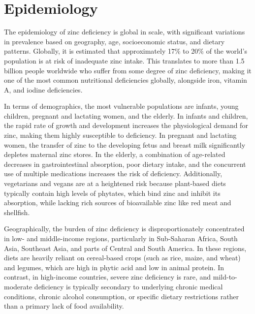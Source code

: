 \section*{Epidemiology}
The epidemiology of zinc deficiency is global in scale, with significant variations in prevalence based on geography, age, socioeconomic status, and dietary patterns. Globally, it is estimated that approximately 17\% to 20\% of the world's population is at risk of inadequate zinc intake. This translates to more than 1.5 billion people worldwide who suffer from some degree of zinc deficiency, making it one of the most common nutritional deficiencies globally, alongside iron, vitamin A, and iodine deficiencies.

In terms of demographics, the most vulnerable populations are infants, young children, pregnant and lactating women, and the elderly. In infants and children, the rapid rate of growth and development increases the physiological demand for zinc, making them highly susceptible to deficiency. In pregnant and lactating women, the transfer of zinc to the developing fetus and breast milk significantly depletes maternal zinc stores. In the elderly, a combination of age-related decreases in gastrointestinal absorption, poor dietary intake, and the concurrent use of multiple medications increases the risk of deficiency. Additionally, vegetarians and vegans are at a heightened risk because plant-based diets typically contain high levels of phytates, which bind zinc and inhibit its absorption, while lacking rich sources of bioavailable zinc like red meat and shellfish.

Geographically, the burden of zinc deficiency is disproportionately concentrated in low- and middle-income regions, particularly in Sub-Saharan Africa, South Asia, Southeast Asia, and parts of Central and South America. In these regions, diets are heavily reliant on cereal-based crops (such as rice, maize, and wheat) and legumes, which are high in phytic acid and low in animal protein. In contrast, in high-income countries, severe zinc deficiency is rare, and mild-to-moderate deficiency is typically secondary to underlying chronic medical conditions, chronic alcohol consumption, or specific dietary restrictions rather than a primary lack of food availability.

